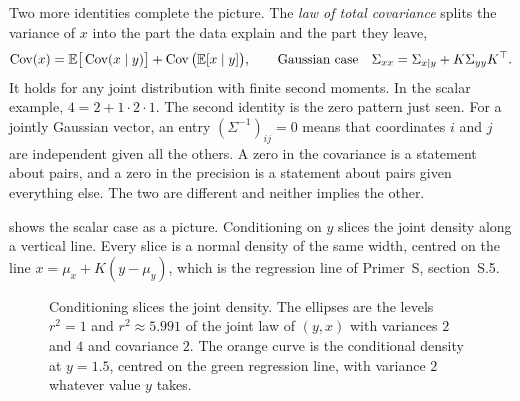 Two more identities complete the picture. The \emph{law of total covariance}
splits the variance of $x$ into the part the data explain and the part they
leave,
\begin{equation}\label{eq:ch02:totalcov}
\operatorname{Cov}(x)=\mathbb{E}\big[\operatorname{Cov}(x\mid y)\big]+\operatorname{Cov}\big(\mathbb{E}[x\mid y]\big),
\qquad\text{Gaussian case}\quad \Sigma_{xx}=\Sigma_{x\mid y}+K\Sigma_{yy}K^{\top} .
\end{equation}
It holds for any joint distribution with finite second moments. In the scalar
example, $4=2+1\cdot2\cdot1$. The second identity is the zero pattern just seen.
For a jointly Gaussian vector, an entry $(\Sigma^{-1})_{ij}=0$ means that
coordinates $i$ and $j$ are independent given all the others. A zero in the
covariance is a statement about pairs, and a zero in the precision is a
statement about pairs given everything else. The two are different and
neither implies the other.

 shows the scalar case as a picture. Conditioning on $y$
slices the joint density along a vertical line. Every slice is a normal
density of the same width, centred on the line $x=\mu_x+K(y-\mu_y)$, which is
the regression line of Primer~S, section~S.5.

\begin{figure}[tbp]
\centering
{}
\caption{Conditioning slices the joint density. The ellipses are the levels
$r^2=1$ and $r^2\approx5.991$ of the joint law of $(y,x)$ with variances $2$
and $4$ and covariance $2$. The orange curve is the conditional density at
$y=1.5$, centred on the green regression line, with variance $2$ whatever
value $y$ takes.}
\label{fig:ch02:slice}
\end{figure}

